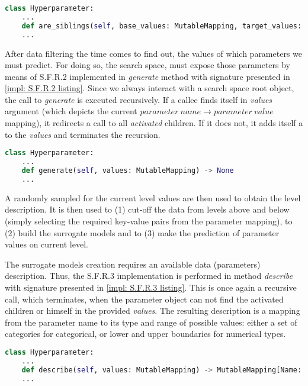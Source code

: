 \begin{lstlisting}[language=Python, caption=S.F.R.1 implementation., label=impl: S.F.R.1 listing]
class Hyperparameter:
	...
    def are_siblings(self, base_values: MutableMapping, target_values: MutableMapping) -> bool
	...
\end{lstlisting}

After data filtering the time comes to find out, the values of which parameters we must predict. For doing so, the search space, must expose those parameters by means of S.F.R.2 implemented in \emph{generate} method with signature presented in \cref{impl: S.F.R.2 listing}. Since we always interact with a search space root object, the call to \emph{generate} is executed recursively. If a callee finds itself in \emph{values} argument (which depicts the current $parameter\ name \rightarrow parameter\ value$ mapping), it redirects a call to all \textit{activated} children. If it does not, it adds itself a to the \emph{values} and terminates the recursion.

\begin{lstlisting}[language=Python, caption=S.F.R.2 implementation., label=impl: S.F.R.2 listing]
class Hyperparameter:
	...
    def generate(self, values: MutableMapping) -> None
	...
\end{lstlisting}

A randomly sampled for the current level values are then used to obtain the level description. It is then used to (1) cut-off the data from levels above and below (simply selecting the required key-value pairs from the parameter mapping), to (2) build the surrogate models and to (3) make the prediction of parameter values on current level.

The surrogate models creation requires an available data (parameters) description. Thus, the S.F.R.3 implementation is performed in method \emph{describe} with signature presented in \cref{impl: S.F.R.3 listing}. This is once again a recursive call, which terminates, when the parameter object can not find the activated children or himself in the provided \emph{values}. The resulting description is a mapping from the parameter name to its type and range of possible values: either a set of categories for categorical, or lower and upper boundaries for numerical types.

\begin{lstlisting}[language=Python, caption=S.F.R.3 implementation., label=impl: S.F.R.3 listing]
class Hyperparameter:
	...
    def describe(self, values: MutableMapping) -> MutableMapping[Name: [Type, Values]]
	...
\end{lstlisting}

